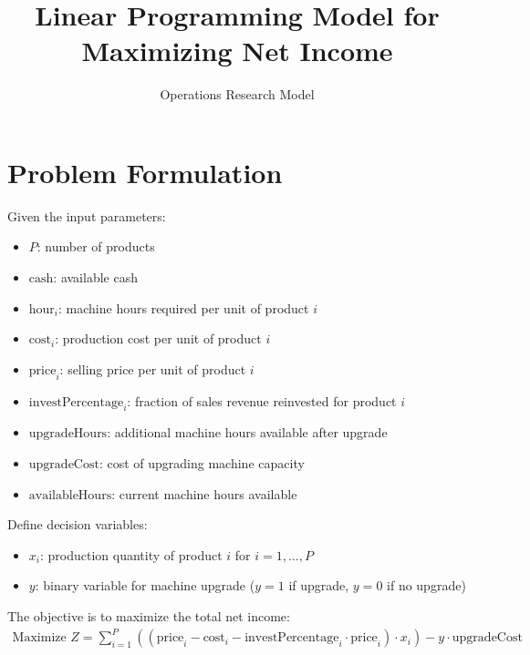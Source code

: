 \documentclass{article}
\begin{document}
\title{Linear Programming Model for Maximizing Net Income}
\author{Operations Research Model}
\date{}
\maketitle

\section*{Problem Formulation}

Given the input parameters:
\begin{itemize}
    \item $P$: number of products
    \item $\text{cash}$: available cash
    \item $\text{hour}_i$: machine hours required per unit of product $i$
    \item $\text{cost}_i$: production cost per unit of product $i$
    \item $\text{price}_i$: selling price per unit of product $i$
    \item $\text{investPercentage}_i$: fraction of sales revenue reinvested for product $i$
    \item $\text{upgradeHours}$: additional machine hours available after upgrade
    \item $\text{upgradeCost}$: cost of upgrading machine capacity
    \item $\text{availableHours}$: current machine hours available
\end{itemize}

Define decision variables:
\begin{itemize}
    \item $x_i$: production quantity of product $i$ for $i = 1, \ldots, P$
    \item $y$: binary variable for machine upgrade ($y = 1$ if upgrade, $y = 0$ if no upgrade)
\end{itemize}

The objective is to maximize the total net income:
\begin{align*}
    \text{Maximize } Z = \sum_{i=1}^{P} \left( (\text{price}_i - \text{cost}_i - \text{investPercentage}_i \cdot \text{price}_i) \cdot x_i \right) - y \cdot \text{upgradeCost}
\end{align*}
\end{document}
